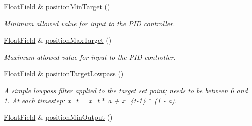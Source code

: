 \begin{DoxyCompactItemize}
\mbox{\label{classhebi_1_1Command_1_1Settings_1_1Actuator_1_1PositionGains_aeaa99efab55ec3de8cf97ccdee6e0a53}} 
\hyperlink{classhebi_1_1Command_1_1FloatField}{Float\+Field} \& \hyperlink{classhebi_1_1Command_1_1Settings_1_1Actuator_1_1PositionGains_aeaa99efab55ec3de8cf97ccdee6e0a53}{position\+Min\+Target} ()
\begin{DoxyCompactList}\small\item\em Minimum allowed value for input to the P\+ID controller. \end{DoxyCompactList}\item 
\mbox{\label{classhebi_1_1Command_1_1Settings_1_1Actuator_1_1PositionGains_a8e1399e09db0a7b43c4539012d2ac1cb}} 
\hyperlink{classhebi_1_1Command_1_1FloatField}{Float\+Field} \& \hyperlink{classhebi_1_1Command_1_1Settings_1_1Actuator_1_1PositionGains_a8e1399e09db0a7b43c4539012d2ac1cb}{position\+Max\+Target} ()
\begin{DoxyCompactList}\small\item\em Maximum allowed value for input to the P\+ID controller. \end{DoxyCompactList}\item 
\mbox{\label{classhebi_1_1Command_1_1Settings_1_1Actuator_1_1PositionGains_a5e5481f01ae7c708260fac42cdbea5f8}} 
\hyperlink{classhebi_1_1Command_1_1FloatField}{Float\+Field} \& \hyperlink{classhebi_1_1Command_1_1Settings_1_1Actuator_1_1PositionGains_a5e5481f01ae7c708260fac42cdbea5f8}{position\+Target\+Lowpass} ()
\begin{DoxyCompactList}\small\item\em A simple lowpass filter applied to the target set point; needs to be between 0 and 1. At each timestep\+: x\+\_\+t = x\+\_\+t $\ast$ a + x\+\_\+\{t-\/1\} $\ast$ (1 -\/ a). \end{DoxyCompactList}\item 
\mbox{\label{classhebi_1_1Command_1_1Settings_1_1Actuator_1_1PositionGains_a2e0e7d2968222f3274043a315e0eca09}} 
\hyperlink{classhebi_1_1Command_1_1FloatField}{Float\+Field} \& \hyperlink{classhebi_1_1Command_1_1Settings_1_1Actuator_1_1PositionGains_a2e0e7d2968222f3274043a315e0eca09}{position\+Min\+Output} ()

\end{DoxyCompactItemize}

